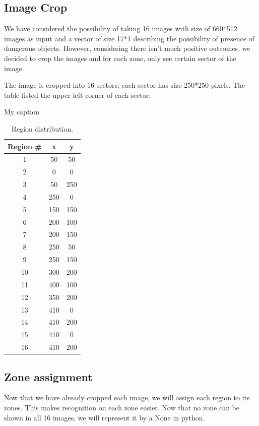 \documentclass[conference,compsoc]{IEEEtran}
\begin{document}
\subsection{Image Crop}
We have considered the possibility of taking 16 images with size of 660*512 images as input and a vector of size 17*1 describing the possibility of presence of dangerous objects. However, considering there isn't much positive outcomes, we decided to crop the images and for each zone, only see certain sector of the image.


The image is cropped into 16 sectors; each sector has size 250*250 pixels. The table listed the upper left corner of each sector:
\begin{table}[!htb]
    \centering
    \caption{My caption}
    \label{my-label}
    \begin{tabular}{ccc}
        \hline
        Region \# & x   & y   \\ \hline
        1         & 50  & 50  \\ \hline
        2         & 0   & 0   \\ \hline
        3         & 50  & 250 \\ \hline
        4         & 250 & 0   \\ \hline
        5         & 150 & 150 \\ \hline
        6         & 200 & 100 \\ \hline
        7         & 200 & 150 \\ \hline
        8         & 250 & 50  \\ \hline
        9         & 250 & 150 \\ \hline
        10        & 300 & 200 \\ \hline
        11        & 400 & 100 \\ \hline
        12        & 350 & 200 \\ \hline
        13        & 410 & 0   \\ \hline
        14        & 410 & 200 \\ \hline
        15        & 410 & 0   \\ \hline
        16        & 410 & 200 \\ \hline
    \end{tabular}
    \caption{Region distribution.}
\end{table}
\subsection{Zone assignment}
Now that we have already cropped each image, we will assign each region to its zones. This makes recognition on each zone easier. Now that no zone can be shown in all 16 images, we will represent it by a None in python.
\end{document}
